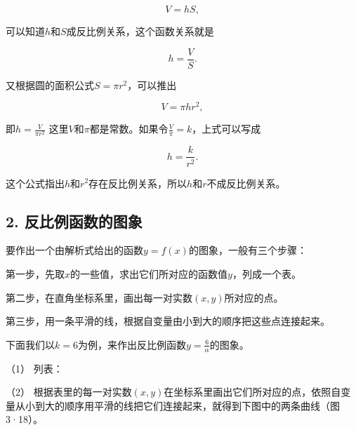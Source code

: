 \[
V = h S,
\]

可以知道\(h\)和\(S\)成反比例关系，这个函数关系就是

\[
h = \frac{V}{S}.
\]

又根据圆的面积公式\(S = \pi r^2\)，可以推出

\[
V = \pi h r^{2},
\]

即\(h = \frac{V}{\pi r^2}\)
这里\(V\)和\(\pi\)都是常数。如果令\(\frac{V}{\pi} = k\)，上式可以写成

\[
h = \frac{k}{r^{2}}.
\]

这个公式指出\(h\)和\(r^2\)存在反比例关系，所以\(h\)和\(r\)不成反比例关系。

\subsection{2. 反比例函数的图象}

要作出一个由解析式给出的函数\(y = f(x)\)的图象，一般有三个步骤：

第一步，先取\(x\)的一些值，求出它们所对应的函数值\(y\)，列成一个表。

第二步，在直角坐标系里，画出每一对实数\((x, y)\)所对应的点。

第三步，用一条平滑的线，根据自变量由小到大的顺序把这些点连接起来。

下面我们以\(k = 6\)为例，来作出反比例函数\(y = \frac{6}{\alpha}\)的图象。

（1） 列表：

{\centering
\scriptsize\setlength{\tabcolsep}{2.2pt}%
\par
}

（2）
根据表里的每一对实数\((x, y)\)在坐标系里画出它们所对应的点，依照自变量从小到大的顺序用平滑的线把它们连接起来，就得到下图中的两条曲线（图3·18）。


